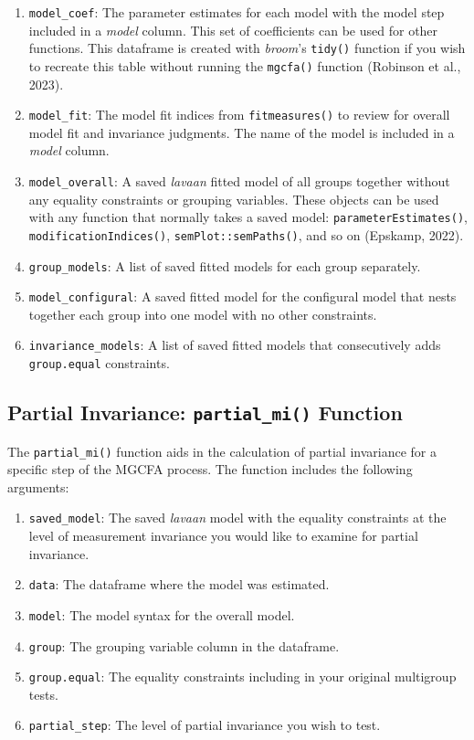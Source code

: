 \documentclass[
  man,floatsintext]{apa7}
\providecommand{\tightlist}{%
  \setlength{\itemsep}{0pt}\setlength{\parskip}{0pt}}
\begin{document}
\begin{enumerate}
\def\labelenumi{\arabic{enumi})}
\tightlist
\item
  \texttt{model\_coef}: The parameter estimates for each model with the model step included in a \emph{model} column. This set of coefficients can be used for other functions. This dataframe is created with \emph{broom}'s \texttt{tidy()} function if you wish to recreate this table without running the \texttt{mgcfa()} function (Robinson et al., 2023).
\item
  \texttt{model\_fit}: The model fit indices from \texttt{fitmeasures()} to review for overall model fit and invariance judgments. The name of the model is included in a \emph{model} column.
\item
  \texttt{model\_overall}: A saved \emph{lavaan} fitted model of all groups together without any equality constraints or grouping variables. These objects can be used with any function that normally takes a saved model: \texttt{parameterEstimates()}, \texttt{modificationIndices()}, \texttt{semPlot::semPaths()}, and so on (Epskamp, 2022).
\item
  \texttt{group\_models}: A list of saved fitted models for each group separately.
\item
  \texttt{model\_configural}: A saved fitted model for the configural model that nests together each group into one model with no other constraints.
\item
  \texttt{invariance\_models}: A list of saved fitted models that consecutively adds \texttt{group.equal} constraints.
\end{enumerate}

\subsection{\texorpdfstring{Partial Invariance: \texttt{partial\_mi()} Function}{Partial Invariance: partial\_mi() Function}}\label{partial-invariance-partial_mi-function}

The \texttt{partial\_mi()} function aids in the calculation of partial invariance for a specific step of the MGCFA process. The function includes the following arguments:

\begin{enumerate}
\def\labelenumi{\arabic{enumi})}
\tightlist
\item
  \texttt{saved\_model}: The saved \emph{lavaan} model with the equality constraints at the level of measurement invariance you would like to examine for partial invariance.
\item
  \texttt{data}: The dataframe where the model was estimated.
\item
  \texttt{model}: The model syntax for the overall model.
\item
  \texttt{group}: The grouping variable column in the dataframe.
\item
  \texttt{group.equal}: The equality constraints including in your original multigroup tests.
\item
  \texttt{partial\_step}: The level of partial invariance you wish to test.
\end{enumerate}
\end{document}
